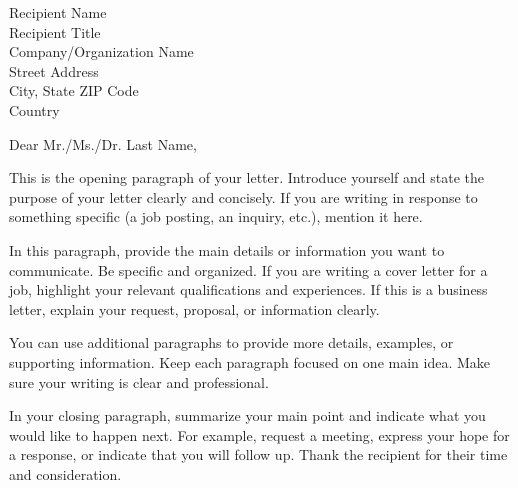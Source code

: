 \documentclass[11pt]{letter}
\begin{document}

\begin{letter}{
    Recipient Name \\
    Recipient Title \\
    Company/Organization Name \\
    Street Address \\
    City, State ZIP Code \\
    Country
}


\opening{Dear Mr./Ms./Dr. Last Name,}



This is the opening paragraph of your letter. Introduce yourself and state the purpose 
of your letter clearly and concisely. If you are writing in response to something 
specific (a job posting, an inquiry, etc.), mention it here.

In this paragraph, provide the main details or information you want to communicate. 
Be specific and organized. If you are writing a cover letter for a job, highlight 
your relevant qualifications and experiences. If this is a business letter, explain 
your request, proposal, or information clearly.

You can use additional paragraphs to provide more details, examples, or supporting 
information. Keep each paragraph focused on one main idea. Make sure your writing is 
clear and professional.

In your closing paragraph, summarize your main point and indicate what you would like 
to happen next. For example, request a meeting, express your hope for a response, or 
indicate that you will follow up. Thank the recipient for their time and consideration.



\end{letter}
\end{document}
